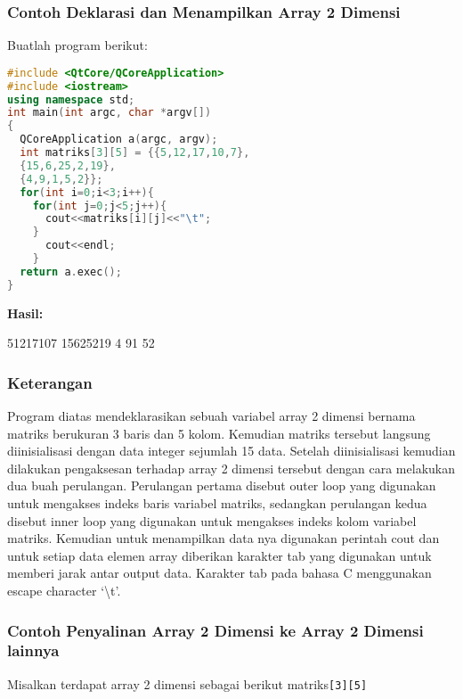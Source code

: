 \subsubsection*{Contoh  Deklarasi dan Menampilkan Array 2 Dimensi}

Buatlah program berikut:

\begin{lstlisting}[language=c++, caption=Deklarasi dan Menampilkan Array 2 Dimensi, label=contoh3-10]
#include <QtCore/QCoreApplication>
#include <iostream>
using namespace std;
int main(int argc, char *argv[])
{
  QCoreApplication a(argc, argv);
  int matriks[3][5] = {{5,12,17,10,7},
  {15,6,25,2,19},
  {4,9,1,5,2}};
  for(int i=0;i<3;i++){
    for(int j=0;j<5;j++){
      cout<<matriks[i][j]<<"\t";
    }
      cout<<endl;
    }
  return a.exec();
}
\end{lstlisting}

\textbf{Hasil:}

\begin{lcverbatim}
51217107
15625219
4 91 52
\end{lcverbatim}


\subsubsection*{Keterangan}

Program diatas mendeklarasikan sebuah variabel array 2 dimensi bernama
matriks berukuran 3 baris dan 5 kolom. Kemudian matriks tersebut
langsung diinisialisasi dengan data integer sejumlah 15 data. Setelah
diinisialisasi kemudian dilakukan pengaksesan terhadap array 2 dimensi
tersebut dengan cara melakukan dua buah perulangan. Perulangan pertama
disebut outer loop yang digunakan untuk mengakses indeks baris variabel
matriks, sedangkan perulangan kedua disebut inner loop yang digunakan
untuk mengakses indeks kolom variabel matriks. Kemudian untuk
menampilkan data nya digunakan perintah cout dan untuk setiap data
elemen array diberikan karakter tab yang digunakan untuk memberi jarak
antar output data. Karakter tab pada bahasa C menggunakan escape
character `\textbackslash{}t'.

\subsubsection*{Contoh  Penyalinan Array 2 Dimensi ke Array 2 Dimensi lainnya}

Misalkan terdapat array 2 dimensi sebagai berikut
matriks\texttt{{[}3{]}{[}5{]}}

